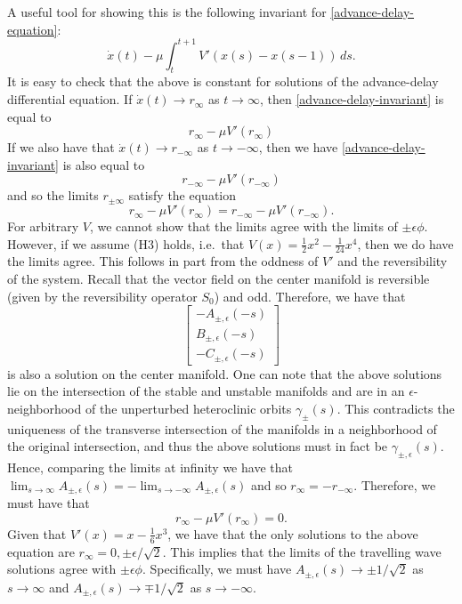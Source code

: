 A useful tool for showing this is the following invariant for \cref{advance-delay-equation}:
\begin{equation}\label{advance-delay-invariant}
	\dot x(t) - \mu \int_t^{t+1} V'(x(s) - x(s-1)) \, ds.
\end{equation}
It is easy to check that the above is constant for solutions of the advance-delay differential equation. If \(\dot x(t) \to r_\infty\) as \(t\to \infty\), then \cref{advance-delay-invariant} is equal to 
\begin{equation}
	r_\infty - \mu V'(r_\infty)
\end{equation}
If we also have that \(\dot x(t) \to r_{-\infty}\) as \(t\to-\infty\), then we have \cref{advance-delay-invariant} is also equal to 
\begin{equation}
	r_{-\infty} - \mu V'(r_{-\infty}) 
\end{equation}
and so the limits \(r_{\pm \infty}\) satisfy the equation
\begin{equation}
	r_\infty - \mu V'(r_\infty) = r_{-\infty} - \mu V'(r_{-\infty}) .
\end{equation}
For arbitrary \(V\), we cannot show that the limits agree with the limits of \(\pm\epsilon \phi \). However, if we assume (H3) holds, i.e.\ that \(V(x) = \frac 1 2 x^2 - \frac 1 {24} x^4\), then we do have the limits agree. This follows in part from the oddness of \(V'\) and the reversibility of the system. Recall that the vector field on the center manifold is reversible (given by the reversibility operator \(S_0\)) and odd. Therefore, we have that
\begin{equation}
	\begin{bmatrix}
		- A_{\pm, \epsilon} (-s) \\
		B_{\pm, \epsilon} (-s) \\
		-C_{\pm, \epsilon} (-s)
	\end{bmatrix}
\end{equation}
is also a solution on the center manifold. One can note that the above solutions lie on the intersection of the stable and unstable manifolds and are in an \(\epsilon\)-neighborhood of the unperturbed heteroclinic orbits \(\gamma_{\pm}(s)\). This contradicts the uniqueness of the transverse intersection of the manifolds in a neighborhood of the original intersection, and thus the above solutions must in fact be \(\gamma_{\pm,\epsilon}(s)\). Hence, comparing the limits at infinity we have that \(\lim_{s\to\infty} A_{\pm,\epsilon} (s) = -\lim_{s\to-\infty} A_{\pm, \epsilon}(s)\) and so \(r_\infty = - r_{-\infty}\). Therefore, we must have that 
\begin{equation}
	r_\infty - \mu V'(r_\infty) = 0.
\end{equation}
Given that \(V'(x) = x - \frac 1 6 x^3\), we have that the only solutions to the above equation are \(r_{\infty} = 0, \pm \epsilon / \sqrt 2\). This implies that the limits of the travelling wave solutions agree with \(\pm \epsilon \phi\). Specifically, we must have \(A_{\pm, \epsilon}(s) \to \pm 1 / \sqrt 2\) as \(s\to \infty\) and \(A_{\pm, \epsilon}(s) \to \mp 1 / \sqrt 2\) as \(s\to -\infty\).

